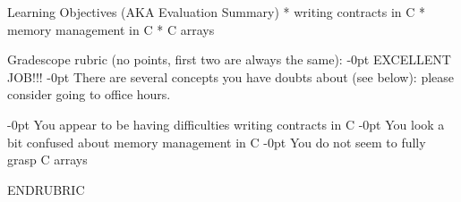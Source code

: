 \documentclass[12pt]{exam}
\begin{document}


\begin{questions}
\end{questions}

\RUBRIC

Learning Objectives (AKA Evaluation Summary)
* writing contracts in C
* memory management in C
* C arrays

Gradescope rubric (no points, first two are always the same):
-0pt EXCELLENT JOB!!!
-0pt There are several concepts you have doubts about (see below): please consider going to office hours.

-0pt You appear to be having difficulties writing contracts in C
-0pt You look a bit confused about memory management in C
-0pt You do not seem to fully grasp C arrays

ENDRUBRIC


\end{document}
